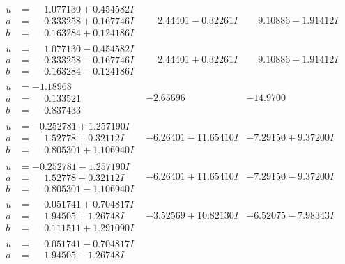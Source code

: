 \documentclass[1p]{elsarticle_modified}
\theoremstyle{definition}
\begin{document}
$$\begin{array}{c|c|c}
\begin{aligned}
u &= \phantom{-}1.077130 + 0.454582 I \\
a &= \phantom{-}0.333258 + 0.167746 I \\
b &= \phantom{-}0.163284 + 0.124186 I\end{aligned}
 & \phantom{-}2.44401 - 0.32261 I & \phantom{-}9.10886 - 1.91412 I \\ \hline\begin{aligned}
u &= \phantom{-}1.077130 - 0.454582 I \\
a &= \phantom{-}0.333258 - 0.167746 I \\
b &= \phantom{-}0.163284 - 0.124186 I\end{aligned}
 & \phantom{-}2.44401 + 0.32261 I & \phantom{-}9.10886 + 1.91412 I \\ \hline\begin{aligned}
u &= -1.18968\phantom{ +0.000000I} \\
a &= \phantom{-}0.133521\phantom{ +0.000000I} \\
b &= \phantom{-}0.837433\phantom{ +0.000000I}\end{aligned}
 & -2.65696\phantom{ +0.000000I} & -14.9700\phantom{ +0.000000I} \\ \hline\begin{aligned}
u &= -0.252781 + 1.257190 I \\
a &= \phantom{-}1.52778 + 0.32112 I \\
b &= \phantom{-}0.805301 + 1.106940 I\end{aligned}
 & -6.26401 - 11.65410 I & -7.29150 + 9.37200 I \\ \hline\begin{aligned}
u &= -0.252781 - 1.257190 I \\
a &= \phantom{-}1.52778 - 0.32112 I \\
b &= \phantom{-}0.805301 - 1.106940 I\end{aligned}
 & -6.26401 + 11.65410 I & -7.29150 - 9.37200 I \\ \hline\begin{aligned}
u &= \phantom{-}0.051741 + 0.704817 I \\
a &= \phantom{-}1.94505 + 1.26748 I \\
b &= \phantom{-}0.111511 + 1.291090 I\end{aligned}
 & -3.52569 + 10.82130 I & -6.52075 - 7.98343 I \\ \hline\begin{aligned}
u &= \phantom{-}0.051741 - 0.704817 I \\
a &= \phantom{-}1.94505 - 1.26748 I \\

\end{aligned}
\end{array}$$
\end{document}
